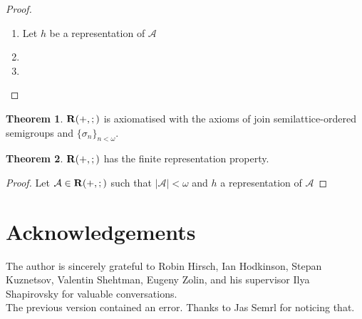 \documentclass[a4paper]{article}
\theoremstyle{definition}
\theoremstyle{theorem}
\newtheorem{theorem}{Theorem}
\theoremstyle{proposition}
\theoremstyle{lemma}
\theoremstyle{ex}
\theoremstyle{corollary}
\theoremstyle{claim}
\begin{document}
\begin{proof}
$ $

  \begin{enumerate}
    \item Let $h$ be a representation of $\mathcal{A}$
    \item
    \item
  \end{enumerate}
\end{proof}

\begin{theorem}
  ${\bf R}(+, ;)$ is axiomatised with the axioms of join semilattice-ordered semigroups and $\{ \sigma_n \}_{n < \omega}$.
\end{theorem}


\begin{theorem}
  ${\bf R}(+, ;)$ has the finite representation property.
\end{theorem}

\begin{proof}
  Let $\mathcal{A} \in {\bf R}(+, ;)$ such that $|\mathcal{A}| < \omega$ and $h$ a representation of $\mathcal{A}$
\end{proof}

\section{Acknowledgements}

The author is sincerely grateful to Robin Hirsch, Ian Hodkinson, Stepan Kuznetsov, Valentin Shehtman, Eugeny Zolin, and his supervisor Ilya Shapirovsky for valuable conversations.\\The previous version contained an error. Thanks to Jas Semrl for noticing that.



\end{document}
